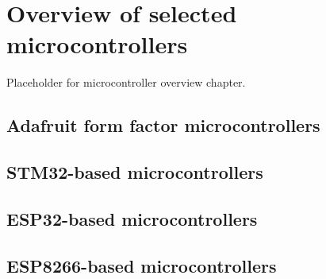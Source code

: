 \setchapterpreamble[u]{\margintoc}
\chapter{\color{gray} Overview of selected microcontrollers \color{black}}

Placeholder for microcontroller overview chapter.

\section{\color{gray} Adafruit form factor microcontrollers \color{black}}

\section{\color{gray} STM32-based microcontrollers \color{black}}

\section{\color{gray} ESP32-based microcontrollers \color{black}}

\section{\color{gray} ESP8266-based microcontrollers \color{black}}
